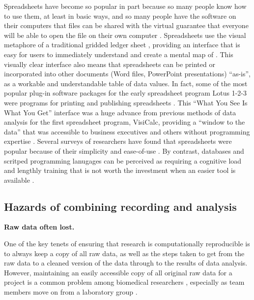 \documentclass[]{tufte-book}
\begin{document}
Spreadsheets have become so popular in part because so many people know how to
use them, at least in basic ways, and so many people have the software on their
computers that files can be shared with the virtual guarantee that everyone will
be able to open the file on their own computer \citep{hermans2016spreadsheets}.
Spreadsheets use the visual metaphore of a traditional gridded ledger sheet
\citep{levy1984spreadsheet}, providing an interface that is easy for users to
immediately understand and create a mental map of \citep{birch2018future, barga2011bioinformatics}. This visually clear interface also means that
spreadsheets can be printed or incorporated into other documents (Word files,
PowerPoint presentations) ``as-is'', as a workable and understandable table of
data values. In fact, some of the most popular plug-in software packages for the
early spreadsheet program Lotus 1-2-3 were programs for printing and publishing
spreadsheets \citep{campbell2007number}. This ``What You See Is What You Get''
interface was a huge advance from previous methods of data analysis for the
first spreadsheet program, VisiCalc, providing a ``window to the data'' that was
accessible to business executives and others without programming expertise
\citep{creeth1985microcomputer}. Several surveys of researchers have found that
spreadsheets were popular because of their simplicity and ease-of-use
\citep{anderson2007issues, altarawneh2017pilot, barga2011bioinformatics}. By
contrast, databases and scritped programming lanugages can be perceived as
requiring a cognitive load and lengthly training that is not worth the
investment when an easier tool is available \citep{hermans2016spreadsheets, anderson2007issues, myneni2010organization, barga2011bioinformatics, topaloglou2004biological}.

\hypertarget{hazards-of-combining-recording-and-analysis}{%
\subsection{Hazards of combining recording and analysis}\label{hazards-of-combining-recording-and-analysis}}

\textbf{Raw data often lost.}

One of the key tenets of ensuring that research is computationally reproducible
is to always keep a copy of all raw data, as well as the steps taken to get from
the raw data to a cleaned version of the data through to the results of data
analysis. However, maintaining an easily accessible copy of all original raw data
for a project is a common problem among biomedical researchers
\citep{goodman2014ten}, especially as team members move on from a laboratory group
\citep{myneni2010organization}.
\end{document}
